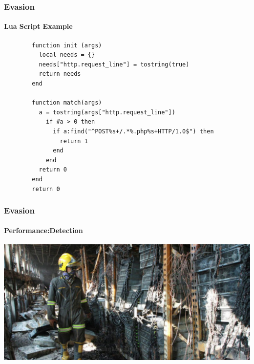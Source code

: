 \documentclass[aspectratio=169]{beamer}
\begin{document}
\begin{frame}[fragile]{}
  \frametitle{Evasion}
  \framesubtitle{Lua Script Example}
  \begin{center}
    \begin{tcolorbox}[title=alert.lua,colback=black]
    \begin{minipage}{0.5\textwidth}
      \begin{verbatim}
        function init (args)
          local needs = {}
          needs["http.request_line"] = tostring(true)
          return needs
        end

        function match(args)
          a = tostring(args["http.request_line"])
            if #a > 0 then
              if a:find("^POST%s+/.*%.php%s+HTTP/1.0$") then
                return 1
              end
            end
          return 0
        end
        return 0
      \end{verbatim}
    \end{minipage}
    \end{tcolorbox}
  \end{center}
\end{frame}

\begin{frame}
  \frametitle{Evasion}
  \framesubtitle{Performance:Detection}
  \begin{center}
    \includegraphics[width=14cm,keepaspectratio]{server_room_fire}
  \end{center}
\end{frame}
\end{document}
